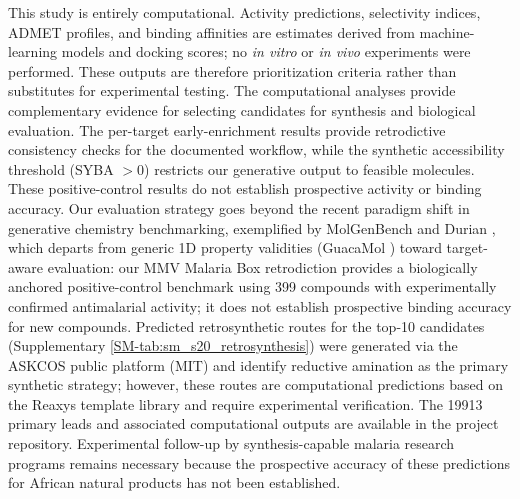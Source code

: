 \documentclass[journal=jcisd8,manuscript=article]{achemso}
\begin{document}
This study is entirely computational. Activity predictions, selectivity indices, ADMET profiles, and binding affinities are estimates derived from machine-learning models and docking scores; no \textit{in vitro} or \textit{in vivo} experiments were performed. These outputs are therefore prioritization criteria rather than substitutes for experimental testing. The computational analyses provide complementary evidence for selecting candidates for synthesis and biological evaluation. The per-target early-enrichment results provide retrodictive consistency checks for the documented workflow, while the synthetic accessibility threshold (SYBA $> \num{0}$)
restricts our generative output to feasible molecules. These positive-control results do not establish prospective activity or binding accuracy. Our evaluation strategy goes beyond the recent paradigm shift in generative chemistry benchmarking,
exemplified by MolGenBench \cite{Cao2025molgenbench} and Durian \cite{Nie2024durian}, which departs from generic 1D property validities (GuacaMol
\cite{Brown2019}) toward target-aware evaluation: our MMV Malaria Box retrodiction provides a biologically anchored positive-control benchmark using \num{399} compounds with experimentally confirmed antimalarial activity; it does not establish prospective binding accuracy for new compounds. Predicted
retrosynthetic routes for the top-10 candidates (Supplementary \cref{SM-tab:sm_s20_retrosynthesis}) were generated via the ASKCOS public platform (MIT) and
identify reductive amination as the primary synthetic strategy; however, these routes are computational predictions based on the Reaxys template library and
require experimental verification. The \num{19913} primary leads and associated computational outputs are available in the project repository. Experimental follow-up by synthesis-capable malaria research programs remains necessary because the prospective accuracy of these predictions for African natural products has not been established.
\end{document}
